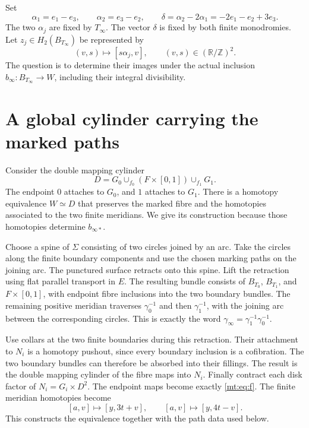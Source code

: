 Set
\begin{equation}\label{mt:eq:alpha}
\alpha_1=e_1-e_3,\qquad \alpha_2=e_3-e_2,\qquad
\delta=\alpha_2-2\alpha_1=-2e_1-e_2+3e_3.
\end{equation}
The two $\alpha_j$ are fixed by $T_\infty$.
The vector $\delta$ is fixed by both finite monodromies.
Let $z_j\in H_2(B_{T_\infty})$ be represented by
\begin{equation}\label{mt:eq:z}
(v,s)\longmapsto[s\alpha_j,v],\qquad (v,s)\in(\mathbb R/\mathbb Z)^2.
\end{equation}
The question is to determine their images under the actual inclusion
$b_\infty:B_{T_\infty}\to W$, including their integral divisibility.

\section{A global cylinder carrying the marked paths}

Consider the double mapping cylinder
\begin{equation}\label{mt:eq:double}
D=G_0\cup_{f_0}(F\times[0,1])\cup_{f_1}G_1.
\end{equation}
The endpoint $0$ attaches to $G_0$, and $1$ attaches to $G_1$.
There is a homotopy equivalence $W\simeq D$ that preserves the marked
fibre and the homotopies associated to the two finite meridians.
We give its construction because those homotopies determine $b_{\infty*}$.

Choose a spine of $\Sigma$ consisting of two circles joined by an arc.
Take the circles along the finite boundary components and use the chosen
marking paths on the joining arc.
The punctured surface retracts onto this spine.
Lift the retraction using flat parallel transport in $E$.
The resulting bundle consists of $B_{T_0}$, $B_{T_1}$, and $F\times[0,1]$,
with endpoint fibre inclusions into the two boundary bundles.
The remaining positive meridian traverses $\gamma_0^{-1}$ and then
$\gamma_1^{-1}$, with the joining arc between the corresponding circles.
This is exactly the word $\gamma_\infty=\gamma_1^{-1}\gamma_0^{-1}$.

Use collars at the two finite boundaries during this retraction.
Their attachment to $N_i$ is a homotopy pushout, since every boundary
inclusion is a cofibration.
The two boundary bundles can therefore be absorbed into their fillings.
The result is the double mapping cylinder of the fibre maps into $N_i$.
Finally contract each disk factor of $N_i=G_i\times D^2$.
The endpoint maps become exactly \eqref{mt:eq:f}.
The finite meridian homotopies become
\begin{equation}\label{mt:eq:homotopies}
[a,v]\longmapsto[y,3t+v],\qquad
[a,v]\longmapsto[y,4t-v].
\end{equation}
This constructs the equivalence together with the path data used below.

